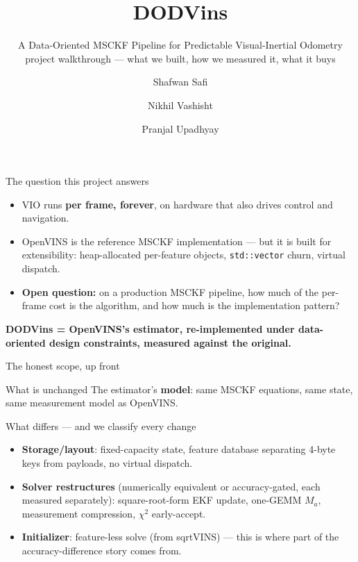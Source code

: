\documentclass[aspectratio=169,11pt]{beamer}
\title[DODVins]{DODVins}
\subtitle{A Data-Oriented MSCKF Pipeline for Predictable Visual-Inertial Odometry\\
\small project walkthrough --- what we built, how we measured it, what it buys}
\author[Shafwan]{Shafwan Safi \and Nikhil Vashisht \and Pranjal Upadhyay}
\institute[]{IISER Bhopal}
\date{}
\begin{document}
\begin{frame}
  \titlepage
\end{frame}

\begin{frame}{The question this project answers}
  \begin{itemize}
    \item VIO runs \textbf{per frame, forever}, on hardware that also drives
          control and navigation.
    \item OpenVINS is the reference MSCKF implementation --- but it is built
          for extensibility: heap-allocated per-feature objects,
          \texttt{std::vector} churn, virtual dispatch.
    \item \textbf{Open question:} on a production MSCKF pipeline, how much of
          the per-frame cost is the algorithm, and how much is the
          implementation pattern?
  \end{itemize}
  \vfill
  \centering
  \textbf{DODVins = OpenVINS's estimator, re-implemented under data-oriented
  design constraints, measured against the original.}
\end{frame}

\begin{frame}{The honest scope, up front}
  \begin{block}{What is unchanged}
    The estimator's \textbf{model}: same MSCKF equations, same state, same
    measurement model as OpenVINS.
  \end{block}
  \begin{block}{What differs --- and we classify every change}
    \begin{itemize}
      \item \textbf{Storage/layout}: fixed-capacity state, feature database
            separating 4-byte keys from payloads, no virtual dispatch.
      \item \textbf{Solver restructures} (numerically equivalent or
            accuracy-gated, each measured separately): square-root-form EKF
            update, one-GEMM $M_a$, measurement compression, $\chi^2$
            early-accept.
      \item \textbf{Initializer}: feature-less solve (from sqrtVINS) ---
            this is where part of the accuracy-difference story comes from.
    \end{itemize}
  \end{block}
\end{frame}
\end{document}
